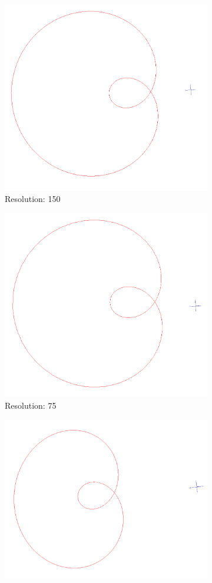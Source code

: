 \documentclass[acmlarge,nonacm=true]{acmart}
\begin{document}
\begin{figure}[H]
	\begin{subfigure}{.33\textwidth}
		\centering
		\includegraphics[width=.8\linewidth]{fig/1b_150}
		\caption{Resolution: 150}
	\end{subfigure}%
	\begin{subfigure}{.33\textwidth}
		\centering
		\includegraphics[width=.8\linewidth]{fig/1b_75}
		\caption{Resolution: 75}
	\end{subfigure}
	\begin{subfigure}{.33\textwidth}
			\centering
			\includegraphics[width=.8\linewidth]{fig/1b_300}

\end{subfigure}
\end{figure}
\end{document}
